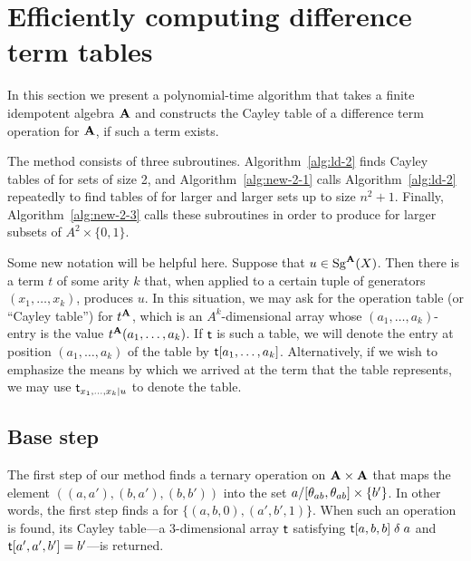 \section{Efficiently computing difference term tables}
\label{sec:comp-diff-term}
In this section we present a polynomial-time algorithm that takes
a finite idempotent algebra $\mathbf{A}$ and constructs the Cayley table of
a difference term operation for $\mathbf{A}$, if such a term exists.

The method consists of three subroutines.
Algorithm~\ref{alg:ld-2} finds Cayley tables of \ldtos for sets of size 2,
and Algorithm~\ref{alg:new-2-1} calls Algorithm~\ref{alg:ld-2} repeatedly to find
tables of \ldtos for larger and larger sets up to size $n^2+1$.
Finally, Algorithm~\ref{alg:new-2-3}
calls these subroutines in order to produce \ldtos for larger subsets of
$A^2 \times \{0,1\}$.

Some new notation will be helpful here.  Suppose that $ u \in \operatorname{Sg}^{\mathbf{A}}(X)$.
Then there is a term $t$ of some arity $k$ that, when applied to a certain tuple of
generators $(x_1, \dots, x_k)$, produces $u$.
In this situation, we may ask for the operation table (or ``Cayley table'')
for $t^{\mathbf{A}}$, which is an $A^k$-dimensional array whose $(a_1, \dots, a_k)$-entry
is the value $t^{\mathbf{A}}(a_1, \dots, a_k)$.
If $\mathsf{t}$ is such a table, we will denote the
entry at position $(a_1, \dots, a_k)$ of the table by $\mathsf{t}[a_1, \dots, a_k]$.
Alternatively, if we wish to emphasize the means by which
we arrived at the term that the table represents, we may use
$\mathsf{t}_{x_1,\dots, x_k \mid u}$ to denote the table.

\newcommand{\tripzu}{\ensuremath{(a_0, b_0, 0), (a_1, b_1, 1)}}

\newcommand{\triptik}{\ensuremath{(a,a'),(b,a'),(b,b')}}
\newcommand{\pairtik}{\ensuremath{(a,b, 0), (a', b', 1)}}
\newcommand{\abb}{\ensuremath{(a, b, b)}}
\newcommand{\aabtik}{\ensuremath{(a', a', b')}}

\newcommand{\cabxbtik}{\ensuremath{a/\com{\theta_{ab}} \times \{b'\}}}
\subsection{Base step} %
\label{sec:cc-ld-2}
The first step of our method finds a ternary operation on
$\mathbf{A} \times \mathbf{A}$ that maps the element
$(\triptik)$ into the set
$\cabxbtik$. In other words, the first step finds a \ldto for
$\{\pairtik\}$.
When such an operation is found, its Cayley table---a
$3$-dimensional array $\mathsf{t}$ satisfying
$\mathsf{t}[a,b, b] \mathrel{\delta} a$ and  $\mathsf{t}[a',a',b'] = b'$---is
returned.

